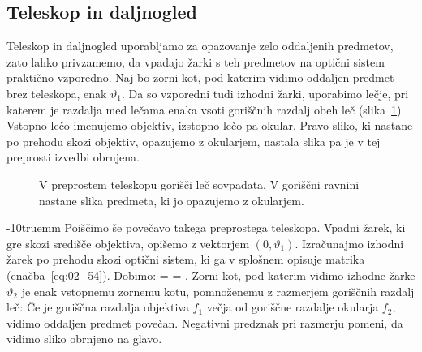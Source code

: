 \subsection*{Teleskop in daljnogled}
Teleskop in daljnogled uporabljamo za opazovanje zelo oddaljenih predmetov, 
zato lahko privzamemo, da vpadajo žarki s teh predmetov na optični sistem praktično vzporedno. 
Naj bo zorni kot, pod katerim vidimo oddaljen predmet brez teleskopa, enak $\vartheta_1$.
Da so vzporedni tudi izhodni žarki, uporabimo lečje, pri katerem je razdalja med 
lečama enaka vsoti goriščnih razdalj obeh leč (slika~\ref{fig:02_teleskop}). Vstopno lečo imenujemo objektiv, 
izstopno lečo pa okular. Pravo sliko, ki nastane po prehodu skozi objektiv,
opazujemo z okularjem, nastala slika pa je v tej preprosti izvedbi obrnjena.
\begin{figure}[ht]
\centering
\def\svgwidth{100truemm} 

\caption{V preprostem teleskopu gorišči leč sovpadata. V goriščni ravnini nastane 
slika predmeta, ki jo opazujemo z okularjem.}
\label{fig:02_teleskop}
\end{figure}
\vglue-10truemm
Poiščimo še povečavo takega preprostega teleskopa. Vpadni žarek, ki gre skozi središče
objektiva, opišemo z vektorjem $(0,\vartheta_1)$. Izračunajmo izhodni žarek po prehodu skozi 
optični sistem, ki ga v splošnem opisuje matrika (enačba~\ref{eq:02_54}). Dobimo:
\beq
{} = 
\cdot
{}  = 
\!\!.
\label{eq:02_66}
\eeq
Zorni kot, pod katerim vidimo izhodne žarke $\vartheta_2$ je enak vstopnemu zornemu kotu, 
pomnoženemu z razmerjem goriščnih razdalj leč:
Če je goriščna razdalja objektiva $f_1$ večja
od goriščne razdalje okularja $f_2$, vidimo oddaljen predmet povečan.
Negativni predznak pri razmerju pomeni, da vidimo sliko obrnjeno na glavo. 

